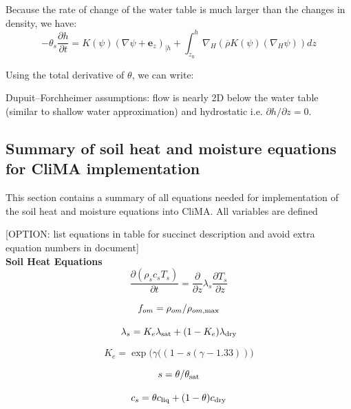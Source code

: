 \documentclass{article}
\begin{document}
Because the rate of change of the water table is much larger than the changes in density, we have: 
\begin{equation}
-	\theta_s \frac{\partial h}{\partial t} = 
 K(\psi) \left(\nabla \psi + {\mathbf e_z} \right)_{|h}  + \int_{z_0}^h  \nabla_H \left( {\overline \rho} K(\psi) \left(\nabla_H \psi \right) \right) dz
\end{equation}

Using the total derivative of $\theta$, we can write:


Dupuit–Forchheimer assumptions: flow is nearly 2D below the water table (similar to shallow water approximation) and hydrostatic i.e. $\partial h/\partial z=0$.

\subsection{Summary of soil heat and moisture equations for CliMA implementation}

This section contains a summary of all equations needed for implementation of the soil heat and moisture equations into CliMA. All variables are defined 

[OPTION: list equations in table for succinct description and avoid extra equation numbers in document] \\

\textbf{Soil Heat Equations} \\


\begin{equation}
     \frac{\partial (\rho_s c_s T_s) }{\partial t} = \frac{\partial }{\partial z}\lambda_s \frac{\partial T_s }{\partial z}
\end{equation}

\begin{equation}
    f_{om} = \rho_{om}/\rho_{om,{\rm max}}
\end{equation}


\begin{equation}
\lambda_s = K_e \lambda_{\rm sat} + (1-K_e) \lambda_{\rm dry}
\end{equation}

\begin{equation}
K_e = \exp \big( \gamma((1-s(\gamma-1.33))\big)
\end{equation}

\begin{equation}
s=\theta/\theta_{\rm sat}
\end{equation}

\begin{equation}
c_s=\theta c_{\rm liq} + (1-\theta) c_{\rm dry}
\end{equation}
\end{document}

